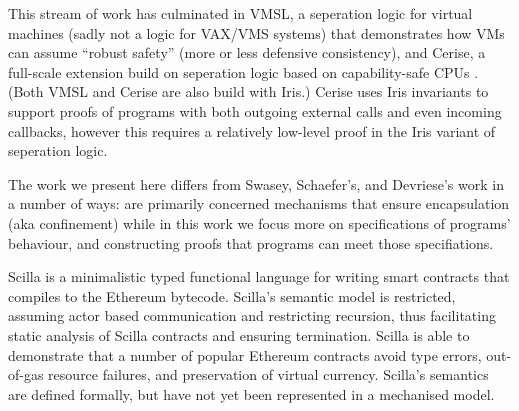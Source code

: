 This stream of work has culminated in VMSL, a seperation logic for
virtual machines 
\cite{vmsl-pldi2023}
(sadly not a logic for VAX/VMS systems)
that demonstrates how VMs can assume ``robust safety'' (more or less
defensive consistency), and Cerise, a full-scale extension build on 
seperation logic based on capability-safe CPUs \cite{cerise-jacm2024}.
(Both VMSL and Cerise are also build with Iris.)
Cerise uses Iris invariants to support proofs of programs with both
outgoing external calls and even incoming callbacks,
however this requires a relatively low-level proof in the Iris variant
of seperation logic. 








 
The work we present here differs from Swasey, Schaefer's, and Devriese's work in a number of ways:
 are primarily concerned  %
mechanisms that ensure encapsulation (aka 
confinement)
while
in this work we focus more on specifications of programs' behaviour,
and constructing proofs that programs can meet those specifiations.

Scilla \cite{scillaOOPSLA19} is a minimalistic typed functional
language for writing smart contracts that compiles to the Ethereum
bytecode. Scilla's semantic model is restricted, assuming actor based
communication and restricting recursion,  thus facilitating static
analysis of Scilla contracts and ensuring termination.
Scilla is able to demonstrate that a number of popular Ethereum
contracts avoid type errors, out-of-gas resource failures, and
preservation of virtual currency. 
Scilla's semantics are defined formally, but have not yet been represented in a
mechanised model.


